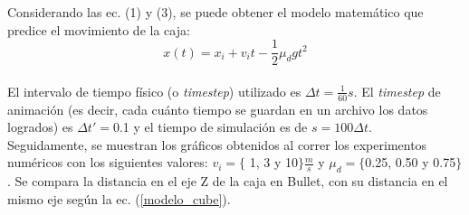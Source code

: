 \documentclass{article}
\begin{document}
Considerando las ec. (1) y (3), se puede obtener el modelo matem\'atico que predice el movimiento de la caja:
 \begin{equation}
 \label{modelo_cube}
  x(t) = x_i +v_i t-\frac{1}{2} \mu_d gt^2
\end{equation}
\\
El intervalo de tiempo f\'isico (o \textit{timestep}) utilizado es $\Delta t=\frac{1}{60} s$. El \textit{timestep} de animaci\'on (es decir,
cada cu\'anto tiempo se guardan en un archivo los datos logrados) es $\Delta t' = $0.1 y el tiempo de simulaci\'on es de $s=100\Delta t$.\\
Seguidamente, se muestran los gr\'aficos obtenidos al correr los experimentos num\'ericos con los siguientes valores: $v_{i}= \{$ 1, 3 y 10$\} \frac{m}{s}$ y $\mu_{d}= \{ $0.25, 0.50 y 0.75$\} $. Se compara la distancia en el eje Z de la caja en Bullet, con su distancia en el mismo eje seg\'un la ec. (\ref{modelo_cube}). 
\end{document}
